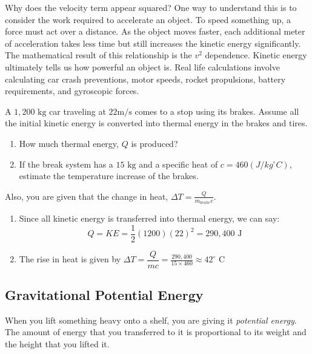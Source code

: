 Why does the velocity term appear squared? One way to understand this is to consider the work required to accelerate an object. To speed something up, a force must act over a distance. As the object moves faster, each additional meter of acceleration takes less time but still increases the kinetic energy significantly. The mathematical result of this relationship is the $v^2$ dependence. Kinetic energy ultimately tells us how powerful an object is. Real life calculations involve calculating car crash preventions, motor speeds, rocket propulsions, battery requirements, and gyroscopic forces.

\begin{Exercise}[title={Kinetic and Thermal Energy}, label=energyBrakingCar]
  A $1,200 \text{ kg}$ car traveling at $22 \text{m/s}$ comes to a stop using its brakes.
  Assume all the initial kinetic energy is converted into thermal energy in the brakes and tires.

  \begin{enumerate}[label=(\alph*)]
    \item How much thermal energy, $Q$ is produced?
    \item If the break system has a $15 \text{ kg}$ and a specific heat of $c = 460 (J/kg^ \circ C)$, estimate the temperature increase of the brakes.
  \end{enumerate}
  Also, you are given that the change in heat, $\Delta T = \frac{Q}{m_{brake}c}$.
\end{Exercise}
\begin{Answer}[ref=energyBrakingCar]
  \begin{enumerate}[label=(\alph*)]
    \item Since all kinetic energy is transferred into thermal energy, we can say:
    \[Q = KE = \frac{1}{2}(1200)(22)^2 = 290,400 \text{ J}\]
    \item The rise in heat is given by $\Delta T = \dfrac{Q}{mc} = \frac{290,400}{15 \times 460} \approx 42^\circ \text{ C}$
  \end{enumerate}
\end{Answer}
\subsection{Gravitational Potential Energy}


When you lift something heavy onto a shelf, you are giving it \textit{potential energy}. The amount of energy that you transferred to it is proportional to its 
weight and the height that you lifted it.

